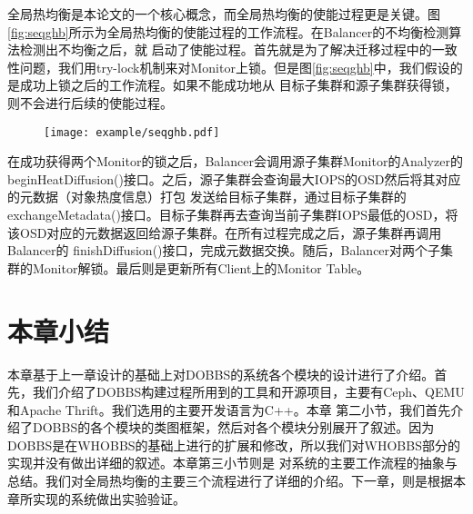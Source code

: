 全局热均衡是本论文的一个核心概念，而全局热均衡的使能过程更是关键。图\ref{fig:seqghb}所示为全局热均衡的使能过程的工作流程。在Balancer的不均衡检测算法检测出不均衡之后，就
启动了使能过程。首先就是为了解决迁移过程中的一致性问题，我们用try-lock机制来对Monitor上锁。但是图\ref{fig:seqghb}中，我们假设的是成功上锁之后的工作流程。如果不能成功地从
目标子集群和源子集群获得锁，则不会进行后续的使能过程。
\begin{figure}[!htp]
    \centering
    \texttt{[image: example/seqghb.pdf]}
\end{figure}
在成功获得两个Monitor的锁之后，Balancer会调用源子集群Monitor的Analyzer的beginHeatDiffusion()接口。之后，源子集群会查询最大IOPS的OSD然后将其对应的元数据（对象热度信息）打包
发送给目标子集群，通过目标子集群的exchangeMetadata()接口。目标子集群再去查询当前子集群IOPS最低的OSD，将该OSD对应的元数据返回给源子集群。在所有过程完成之后，源子集群再调用Balancer的
finishDiffusion()接口，完成元数据交换。随后，Balancer对两个子集群的Monitor解锁。最后则是更新所有Client上的Monitor Table。

\section{本章小结}
本章基于上一章设计的基础上对DOBBS的系统各个模块的设计进行了介绍。首先，我们介绍了DOBBS构建过程所用到的工具和开源项目，主要有Ceph、QEMU和Apache Thrift。我们选用的主要开发语言为C++。本章
第二小节，我们首先介绍了DOBBS的各个模块的类图框架，然后对各个模块分别展开了叙述。因为DOBBS是在WHOBBS的基础上进行的扩展和修改，所以我们对WHOBBS部分的实现并没有做出详细的叙述。本章第三小节则是
对系统的主要工作流程的抽象与总结。我们对全局热均衡的主要三个流程进行了详细的介绍。下一章，则是根据本章所实现的系统做出实验验证。

